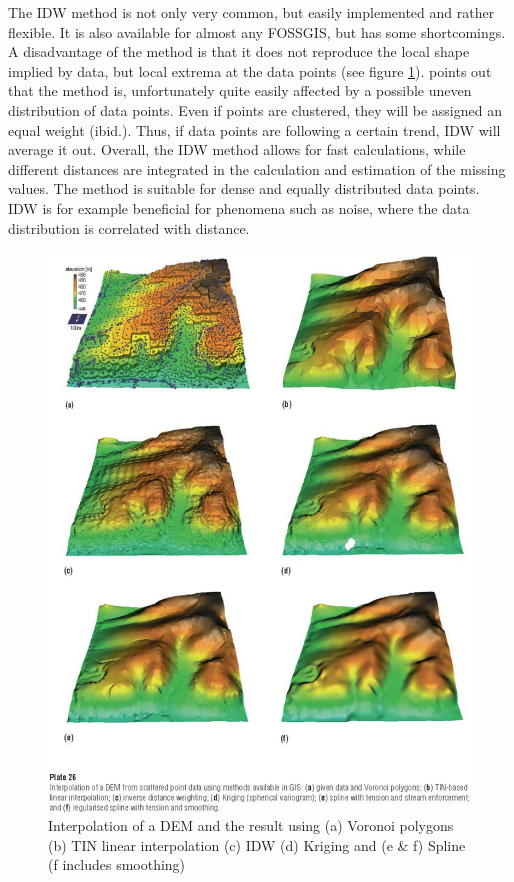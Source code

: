 The IDW method is not only very common, but easily implemented and rather flexible. It is also available for almost any FOSSGIS, but has some shortcomings. A disadvantage of the method is that it does not reproduce the local shape implied by data, but local extrema at the data points (see figure \ref{fig:dem_mitas}). \cite{mitas_spatial_1999} \citeauthor{lam_spatial_2009} points out that the method is, unfortunately quite easily affected by a possible uneven distribution of data points. Even if points are clustered, they will be assigned an equal weight (ibid.). Thus, if data points are following a certain trend, IDW will average it out. 
Overall, the IDW method allows for fast calculations, while different distances are integrated in the calculation and estimation of the missing values. \cite{gitta_raumliche_2016} The method is suitable for dense and equally distributed data points. \cite{wasser_going_2020} IDW is for example beneficial for phenomena such as noise, where the data distribution is correlated with distance. \cite{gis_resources_choosing_2013}

\begin{figure}
	\includegraphics[width=\linewidth]{images/dem.png}
	\caption{Interpolation of a DEM and the result using (a) Voronoi polygons (b) TIN linear interpolation (c) IDW (d) Kriging and (e \& f) Spline (f includes smoothing) \cite{mitas_spatial_1999}}
	\label{fig:dem_mitas}
\end{figure}


